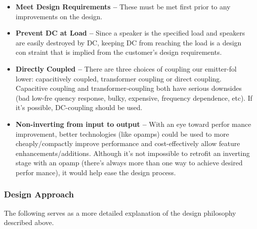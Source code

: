 \documentclass[journal]{IEEEtran}
\begin{document}
\begin{itemize}
\item
\textbf{Meet Design Requirements --} These must be met first prior to any
improvements on the design.
\item
\textbf{Prevent DC at Load --} Since a speaker is the specified load and speakers
are easily destroyed by DC, keeping DC from reaching the load is a design con
straint that is implied from the customer’s design requirements.
\item
\textbf{Directly Coupled --} There are three choices of coupling our emitter-fol
lower: capacitively coupled, transformer coupling or direct coupling. Capacitive
coupling and transformer-coupling both have serious downsides (bad low-fre
quency response, bulky, expensive, frequency dependence, etc). If it’s possible,
DC-coupling should be used.
\item
\textbf{Non-inverting from input to output --} With an eye toward perfor
mance improvement, better technologies (like opamps) could be used to more
cheaply/compactly improve performance and cost-effectively allow feature
enhancements/additions. Although it’s not impossible to retrofit an inverting stage
with an opamp (there’s always more than one way to achieve desired perfor
mance), it would help ease the design process.
\end{itemize}

\subsubsection{Design Approach}

The following serves as a more detailed explanation of the design philosophy described
above.
\end{document}
